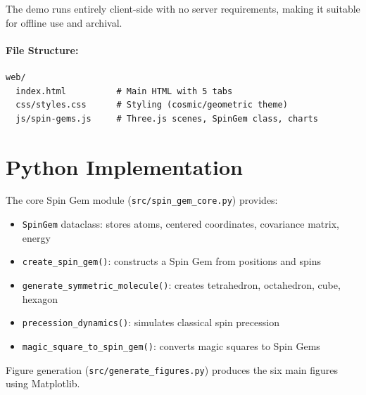 \documentclass[11pt]{article}
\begin{document}
The demo runs entirely client-side with no server requirements, making it suitable for offline use and archival.

\paragraph{File Structure:}
\begin{verbatim}
web/
  index.html          # Main HTML with 5 tabs
  css/styles.css      # Styling (cosmic/geometric theme)
  js/spin-gems.js     # Three.js scenes, SpinGem class, charts
\end{verbatim}

\section{Python Implementation}
\label{app:python}

The core Spin Gem module (\texttt{src/spin\_gem\_core.py}) provides:

\begin{itemize}
    \item \texttt{SpinGem} dataclass: stores atoms, centered coordinates, covariance matrix, energy
    \item \texttt{create\_spin\_gem()}: constructs a Spin Gem from positions and spins
    \item \texttt{generate\_symmetric\_molecule()}: creates tetrahedron, octahedron, cube, hexagon
    \item \texttt{precession\_dynamics()}: simulates classical spin precession
    \item \texttt{magic\_square\_to\_spin\_gem()}: converts magic squares to Spin Gems
\end{itemize}

Figure generation (\texttt{src/generate\_figures.py}) produces the six main figures using Matplotlib.
\end{document}
